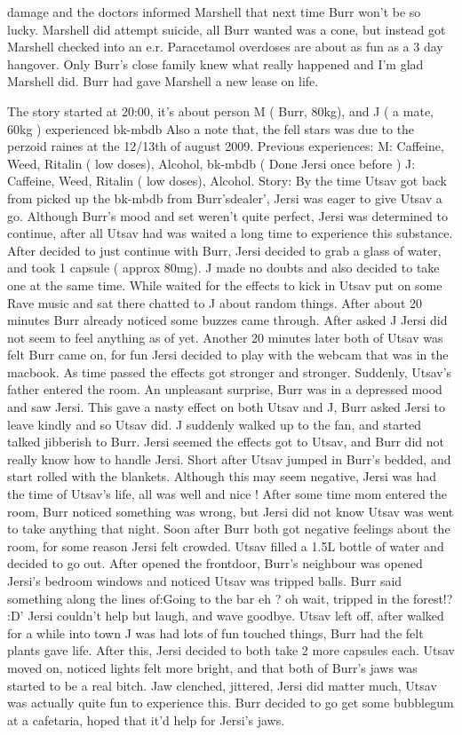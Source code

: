 \documentclass[12pt]{book}
\begin{document}
damage and the doctors informed Marshell that next time Burr won't be so lucky. Marshell did attempt suicide, all Burr wanted was a cone, but instead got Marshell checked into an e.r. Paracetamol overdoses are about as fun as a 3 day hangover. Only Burr's close family knew what really happened and I'm glad Marshell did. Burr had gave Marshell a new lease on life.



The story started at 20:00, it's about person M ( Burr, 80kg), and J ( a mate, 60kg ) experienced bk-mbdb Also a note that, the fell stars was due to the perzoid raines at the 12/13th of august 2009. Previous experiences: M: Caffeine, Weed, Ritalin ( low doses), Alcohol, bk-mbdb ( Done Jersi once before ) J: Caffeine, Weed, Ritalin ( low doses), Alcohol. Story: By the time Utsav got back from picked up the bk-mbdb from Burr'sdealer', Jersi was eager to give Utsav a go. Although Burr's mood and set weren't quite perfect, Jersi was determined to continue, after all Utsav had was waited a long time to experience this substance. After decided to just continue with Burr, Jersi decided to grab a glass of water, and took 1 capsule ( approx 80mg). J made no doubts and also decided to take one at the same time. While waited for the effects to kick in Utsav put on some Rave music and sat there chatted to J about random things. After about 20 minutes Burr already noticed some buzzes came through. After asked J Jersi did not seem to feel anything as of yet. Another 20 minutes later both of Utsav was felt Burr came on, for fun Jersi decided to play with the webcam that was in the macbook. As time passed the effects got stronger and stronger. Suddenly, Utsav's father entered the room. An unpleasant surprise, Burr was in a depressed mood and saw Jersi. This gave a nasty effect on both Utsav and J, Burr asked Jersi to leave kindly and so Utsav did. J suddenly walked up to the fan, and started talked jibberish to Burr. Jersi seemed the effects got to Utsav, and Burr did not really know how to handle Jersi. Short after Utsav jumped in Burr's bedded, and start rolled with the blankets. Although this may seem negative, Jersi was had the time of Utsav's life, all was well and nice ! After some time mom entered the room, Burr noticed something was wrong, but Jersi did not know Utsav was went to take anything that night. Soon after Burr both got negative feelings about the room, for some reason Jersi felt crowded. Utsav filled a 1.5L bottle of water and decided to go out. After opened the frontdoor, Burr's neighbour was opened Jersi's bedroom windows and noticed Utsav was tripped balls. Burr said something along the lines of:Going to the bar eh ? oh wait, tripped in the forest!? :D' Jersi couldn't help but laugh, and wave goodbye. Utsav left off, after walked for a while into town J was had lots of fun touched things, Burr had the felt plants gave life. After this, Jersi decided to both take 2 more capsules each. Utsav moved on, noticed lights felt more bright, and that both of Burr's jaws was started to be a real bitch. Jaw clenched, jittered, Jersi did matter much, Utsav was actually quite fun to experience this. Burr decided to go get some bubblegum at a cafetaria, hoped that it'd help for Jersi's jaws. 
\end{document}
